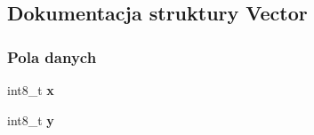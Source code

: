 \hypertarget{struct_vector}{}\subsection{Dokumentacja struktury Vector}
\label{struct_vector}
\subsubsection*{Pola danych}
\begin{DoxyCompactItemize}
\item 
\mbox{\label{struct_vector_a6a78f928e7826e578e289edceea4318a}} 
int8\+\_\+t {\bfseries x}
\item 
\mbox{\label{struct_vector_aae6ebd560a72b31e5e42f09790ae8479}} 
int8\+\_\+t {\bfseries y}
\end{DoxyCompactItemize}
